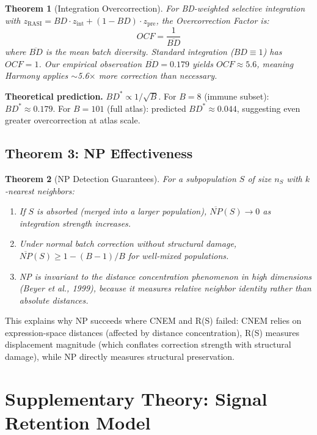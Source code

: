 \documentclass[10pt]{article}
\newtheorem{theorem}{Theorem}
\begin{document}
\begin{theorem}[Integration Overcorrection]
\label{thm:ocf}
For BD-weighted selective integration with $z_{\text{RASI}} = BD \cdot z_{\text{int}} + (1 - BD) \cdot z_{\text{pre}}$, the Overcorrection Factor is:
\begin{equation}
OCF = \frac{1}{\overline{BD}}
\end{equation}
where $\overline{BD}$ is the mean batch diversity. Standard integration ($BD \equiv 1$) has $OCF = 1$. Our empirical observation $\overline{BD} = 0.179$ yields $OCF \approx 5.6$, meaning Harmony applies $\sim$5.6$\times$ more correction than necessary.
\end{theorem}

\textbf{Theoretical prediction.} $BD^* \propto 1/\sqrt{B}$. For $B = 8$ (immune subset): $BD^* \approx 0.179$. For $B = 101$ (full atlas): predicted $BD^* \approx 0.044$, suggesting even greater overcorrection at atlas scale.

\subsection{Theorem 3: NP Effectiveness}

\begin{theorem}[NP Detection Guarantees]
\label{thm:np}
For a subpopulation $S$ of size $n_S$ with $k$-nearest neighbors:
\begin{enumerate}
\item If $S$ is absorbed (merged into a larger population), $\overline{NP}(S) \to 0$ as integration strength increases.
\item Under normal batch correction without structural damage, $\overline{NP}(S) \geq 1 - (B-1)/B$ for well-mixed populations.
\item NP is invariant to the distance concentration phenomenon in high dimensions (Beyer et al., 1999), because it measures relative neighbor identity rather than absolute distances.
\end{enumerate}
\end{theorem}

This explains why NP succeeds where CNEM and R(S) failed: CNEM relies on expression-space distances (affected by distance concentration), R(S) measures displacement magnitude (which conflates correction strength with structural damage), while NP directly measures structural preservation.

\section{Supplementary Theory: Signal Retention Model}
\end{document}
